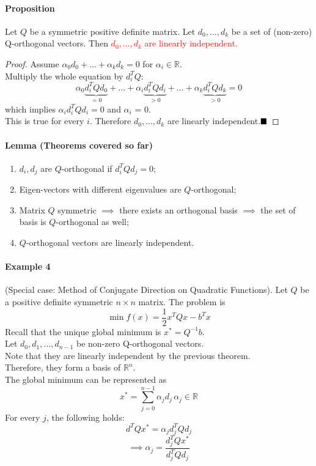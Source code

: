 \documentclass[11pt]{article}
\newcommand{\real}[0]{\mathbb{R}}
\newcommand{\qed}[0]{$\hfill\blacksquare$}
\begin{document}
\paragraph{Proposition}
Let $Q$ be a symmetric positive definite matrix. Let $d_0, \hdots, d_k$ be a set of (non-zero) Q-orthogonal vectors. Then \textcolor{red}{$d_0, \hdots, d_k$ are linearly independent.} \\
\begin{proof}
	Assume $\alpha_0 d_0 + \hdots + \alpha_kd_k = 0$ for $\alpha_i \in \real$. \\
	Multiply the whole equation by $d_i^T Q$:
	$$\alpha_0 \underbrace{d_i^T Qd_0}_{=0} + \hdots + \alpha_i \underbrace{d_i^TQd_i}_{>0} + \hdots + \alpha_k \underbrace{d_i^T Qd_k}_{>0} = 0$$
	which implies $\alpha_i d_i^TQd_i = 0$ and $\alpha_i$ = 0. \\
	This is true for every $i$. Therefore $d_0, \hdots, d_k$ are linearly independent.\qed
\end{proof}

\paragraph{Lemma (Theorems covered so far)}
\begin{enumerate}
	\item $d_i, d_j$ are $Q$-orthogonal if $d_i^TQd_j = 0$;
	\item Eigen-vectors with different eigenvalues are $Q$-orthogonal;
	\item Matrix $Q$ symmetric $\implies$ there exists an orthogonal basis $\implies$ the set of basis is $Q$-orthogonal as well;
	\item $Q$-orthogonal vectors are linearly independent.
\end{enumerate}

\paragraph{Example 4} (Special case: Method of Conjugate Direction on Quadratic Functions). Let $Q$ be a positive definite symmetric $n \times n$ matrix. The problem is
$$\min f(x) = \frac{1}{2}x^TQx - b^Tx$$
Recall that the unique global minimum is $x^* = Q^{-1}b$. \\
Let $d_0, d_1, \hdots, d_{n-1}$ be non-zero Q-orthogonal vectors. \\
Note that they are linearly independent by the previous theorem. \\
Therefore, they form a basis of $\real^n$. \\
The global minimum can be represented as 
$$x^* = \sum_{j=0}^{n-1} \alpha_j d_j \, \alpha_j \in \real$$
For every $j$, the following holds:
$$d^TQx^* = \alpha_jd_j^TQd_j$$
$$\implies \alpha_j = \frac{d_j^TQx^*}{d_j^TQd_j}$$
\end{document}
